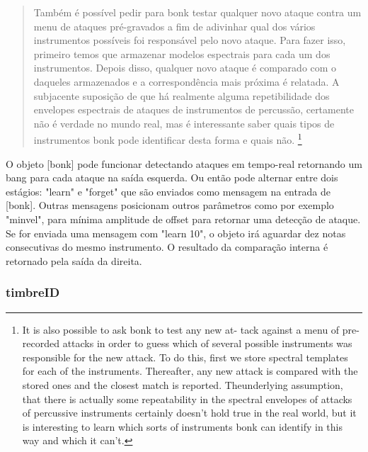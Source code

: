 \documentclass{ppgmus}
\begin{document}
\begin{quote}
Também é possível pedir para bonk testar qualquer novo ataque 
contra um menu de ataques pré-gravados a fim
de adivinhar qual dos vários instrumentos possíveis foi
responsável pelo novo ataque. Para fazer isso, primeiro temos
que armazenar modelos espectrais para cada um dos instrumentos.
Depois disso, qualquer novo ataque é comparado com o
daqueles armazenados e a correspondência mais próxima é relatada. 
A subjacente suposição de que há realmente alguma
repetibilidade dos envelopes espectrais de ataques de
instrumentos de percussão, certamente não é verdade no mundo real, mas é interessante saber quais
tipos de instrumentos bonk pode identificar desta forma
e quais não. \footnote{It is also possible to ask bonk to test any new at-
tack against a menu of pre-recorded attacks in order
to guess which of several possible instruments was
responsible for the new attack. To do this, first we
store spectral templates for each of the instruments.
Thereafter, any new attack is compared with the
stored ones and the closest match is reported. 
Theunderlying assumption, that there is actually some
repeatability in the spectral envelopes of attacks of
percussive instruments certainly doesn't hold true in
the real world, but it is interesting to learn which
sorts of instruments bonk can identify in this way
and which it can't.} \cite{bonk}
\end{quote}

O objeto [bonk\texttildelow] pode funcionar detectando
ataques em tempo-real retornando um bang para cada ataque 
na saída esquerda. Ou então pode alternar entre dois estágios:
"learn" e "forget" que são enviados como mensagem na entrada de 
[bonk\texttildelow]. Outras mensagens posicionam outros
parâmetros como por exemplo "minvel", para mínima amplitude de offset
para retornar uma detecção de ataque.
Se for enviada uma mensagem com "learn 10",
o objeto irá aguardar dez notas consecutivas do mesmo instrumento.
O resultado da comparação interna é retornado pela saída da direita.



\subsubsection{timbreID}
\end{document}
